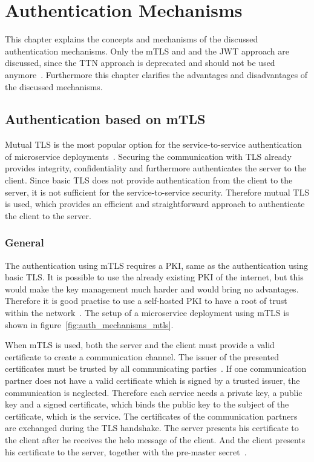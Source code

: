 \chapter{Authentication Mechanisms}
\label{cha:authentication_mechanisms}
This chapter explains the concepts and mechanisms of the discussed authentication mechanisms.
Only the mTLS and and the JWT approach are discussed, since the TTN approach is deprecated and should not be used anymore~\cite{dias2020microservices}.
Furthermore this chapter clarifies the advantages and disadvantages of the discussed mechanisms.

\section{Authentication based on mTLS}
Mutual TLS is the most popular option for the service-to-service authentication of microservice deployments~\cite{dias2020microservices}.
Securing the communication with TLS already provides integrity, confidentiality and furthermore authenticates the server to the client.
Since basic TLS does not provide authentication from the client to the server, it is not sufficient for the service-to-service security.
Therefore mutual TLS is used, which provides an efficient and straightforward approach to authenticate the client to the server.

\subsection{General}
The authentication using mTLS requires a PKI, same as the authentication using basic TLS.
It is possible to use the already existing PKI of the internet, but this would make the key management much harder and would bring no advantages.
Therefore it is good practise to use a self-hosted PKI to have a root of trust within the network~\cite{dias2020microservices}.
The setup of a microservice deployment using mTLS is shown in figure~\ref{fig:auth_mechanisms_mtls}.

When mTLS is used, both the server and the client must provide a valid certificate to create a communication channel.
The issuer of the presented certificates must be trusted by all communicating parties~\cite{dias2020microservices}.
If one communication partner does not have a valid certificate which is signed by a trusted issuer, the communication is neglected.
Therefore each service needs a private key, a public key and a signed certificate, which binds the public key to the subject of the certificate, which is the service.
The certificates of the communication partners are exchanged during the TLS handshake.
The server presents his certificate to the client after he receives the helo message of the client.
And the client presents his certificate to the server, together with the pre-master secret~\cite{krawczyk2013security}.

